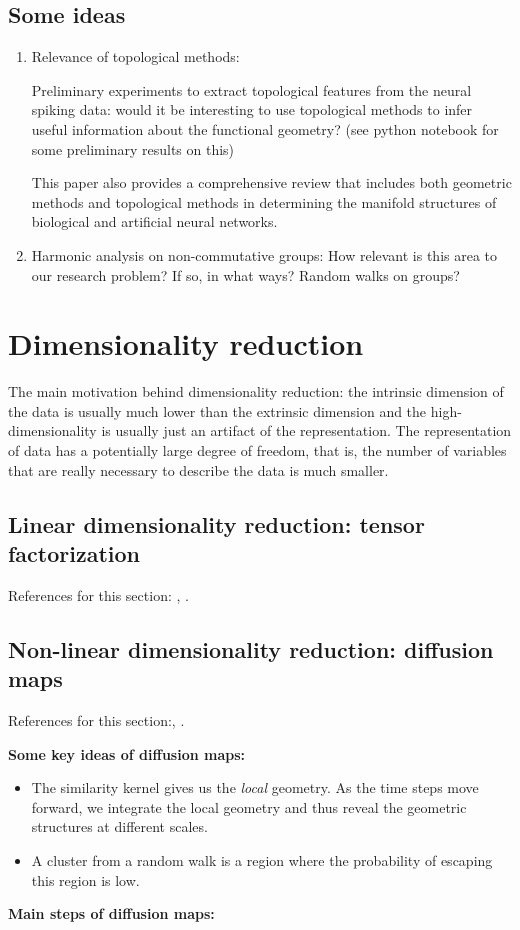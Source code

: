 \documentclass{article}
\begin{document}
\subsection{Some ideas}
\begin{enumerate}
    \item Relevance of topological methods:
    
    Preliminary experiments to extract topological features from the neural spiking data: would it be interesting to use topological methods to infer useful information about the functional geometry? (see python notebook for some preliminary results on this)
    
    This paper \cite{chung_neural_2021} also provides a comprehensive review that includes both geometric methods and topological methods in determining the manifold structures of biological and artificial neural networks.
    
    \item Harmonic analysis on non-commutative groups: How relevant is this area to our research problem? If so, in what ways? Random walks on groups?
    
\end{enumerate}

\section{Dimensionality reduction}

The main motivation behind dimensionality reduction: the intrinsic dimension of the data is usually much lower than the extrinsic dimension and the high-dimensionality is usually just an artifact of the representation. The representation of data has a potentially large degree of freedom, that is, the number of variables that are really necessary to describe the data is much smaller. 

\subsection{Linear dimensionality reduction: tensor factorization}
References for this section: \cite{kolda_tensor_2009}, \cite{hong_generalized_2020}.

\subsection{Non-linear dimensionality reduction: diffusion maps}
References for this section:\cite{coifman_geometric_2005}, \cite{coifman_diffusion_2006}.
\par \textbf{Some key ideas of diffusion maps: }
\begin{itemize}
    \item The similarity kernel gives us the \textit{local} geometry. As the time steps move forward, we integrate the local geometry and thus reveal the geometric structures at different scales. 
    \item A cluster from a random walk is a region where the probability of escaping this region is low.
\end{itemize}
\par \textbf{Main steps of diffusion maps: }
\end{document}
